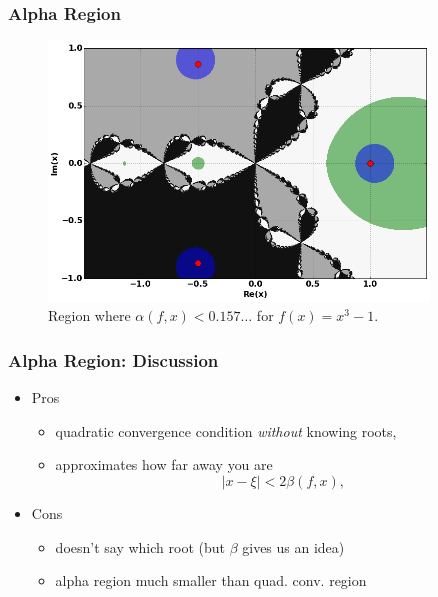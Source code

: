 \documentclass{beamer}
\begin{document}
\begin{frame}
  \frametitle{Alpha Region}
  \begin{figure}
    \centering
    \includegraphics[width=0.9\textwidth]{images/alpha.png}
    \caption{Region where $\alpha(f,x) < 0.157\ldots$ for $f(x) = x^3-1$.}
  \end{figure}
\end{frame}


\begin{frame}
  \frametitle{Alpha Region: Discussion}

  \begin{itemize}
  \item<1-> Pros
    \begin{itemize}
    \item<2-> quadratic convergence condition {\it without} knowing
      roots,
    \item<3-> approximates how far away you are
      \[
      |x - \xi| < 2 \beta(f,x),
      \]
    \end{itemize}
  \item<4-> Cons
    \begin{itemize}
    \item<5-> doesn't say which root (but $\beta$ gives us an idea)
    \item<6-> alpha region much smaller than quad. conv. region
    \end{itemize}
  \end{itemize}
\end{frame}
\end{document}

